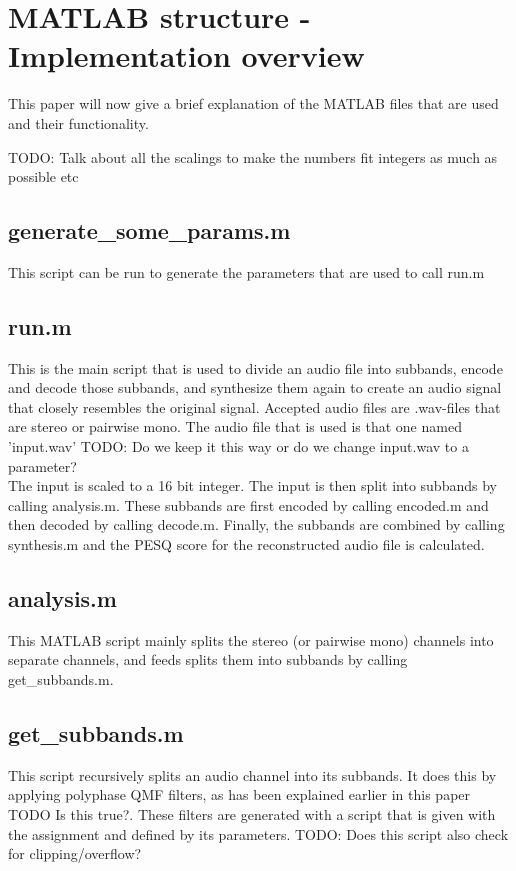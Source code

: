 \documentclass[a4paper]{article}
\begin{document}
\section{MATLAB structure - Implementation overview}
This paper will now give a brief explanation of the MATLAB files that are used and their functionality.

TODO: Talk about all the scalings to make the numbers fit integers as much as possible etc

\subsection{generate\_some\_params.m}
This script can be run to generate the parameters that are used to call run.m

\subsection{run.m}
This is the main script that is used to divide an audio file into subbands, encode and decode those subbands, and synthesize them again to create an audio signal that closely resembles the original signal. Accepted audio files are .wav-files that are stereo or pairwise mono. The audio file that is used is that one named 'input.wav' TODO: Do we keep it this way or do we change input.wav to a parameter? 
\\
The input is scaled to a 16 bit integer. The input is then split into subbands by calling analysis.m. These subbands are first encoded by calling encoded.m and then decoded by calling decode.m. Finally, the subbands are combined by calling synthesis.m and the PESQ score for the reconstructed audio file is calculated.

\subsection{analysis.m}
This MATLAB script mainly splits the stereo (or pairwise mono) channels into separate channels, and feeds splits them into subbands by calling get\_subbands.m.

\subsection{get\_subbands.m}
This script recursively splits an audio channel into its subbands. It does this by applying polyphase QMF filters, as has been explained earlier in this paper TODO Is this true?. These filters are generated with a script that is given with the assignment and defined by its parameters.
TODO: Does this script also check for clipping/overflow?
\end{document}
